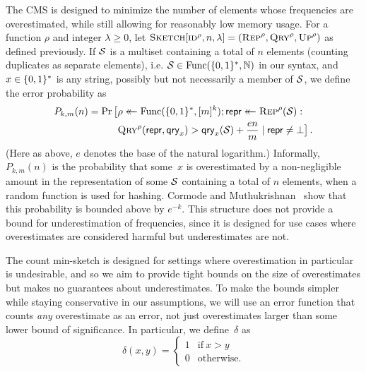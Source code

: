 %
The CMS is designed to minimize the number of elements whose
frequencies are overestimated, while still allowing for reasonably low memory
usage. For a function $\rho$ and integer $\lambda\ge0$, let
$\textnormal{\textsc{Sketch}}[\textnormal{\textsc{id}}^\rho,n,\lambda] = (\textnormal{\textsc{Rep}}^\rho,\textnormal{\textsc{Qry}}^\rho,\textnormal{\textsc{Up}}^\rho)$ as defined
previously. If $\mathcal{S}$ is a multiset containing a total of $n$ elements
(counting duplicates as separate elements), i.e. $\mathcal{S} \in \mathrm{Func}(\{0,1\}^*,\mathbb{N})$ in
our syntax, and $x \in \{0,1\}^*$ is any string, possibly but not necessarily a
member of $\mathcal{S}$, we define the error probability as
\begin{equation}\label{eq:bf-fp}
  \begin{aligned}
    P_{k,m}(n) =
      \Pr\big[&\rho \mathrel{\leftarrow\mkern-14mu\leftarrow} \mathrm{Func}(\{0,1\}^*,[m]^k);
              \mathsf{repr} \mathrel{\leftarrow\mkern-14mu\leftarrow} \textnormal{\textsc{Rep}}^\rho(\mathcal{S}): \\
              &\textnormal{\textsc{Qry}}^\rho(\mathsf{repr}, \mathsf{qry}_x) > \mathsf{qry}_x(\mathcal{S})+\frac{en}{m} \mid \mathsf{repr} \ne \bot
      \big] \,.
  \end{aligned}
\end{equation}
%
(Here as above, $e$ denotes the base of the natural logarithm.)
%
Informally, $P_{k,m}(n)$ is the probability that some~$x$ is overestimated by a
non-negligible amount in the representation of some $\mathcal{S}$ containing a total
of $n$ elements, when a random function is used for hashing. Cormode and
Muthukrishnan~\cite{cormode2005improved} show that this probability is bounded
above by $e^{-k}$. This structure does not provide a bound for underestimation
of frequencies, since it is designed for use cases where overestimates are
considered harmful but underestimates are not.

%
The count min-sketch is designed for settings where overestimation in particular
is undesirable, and so we aim to provide tight bounds on the size of
overestimates but makes no guarantees about underestimates. To make the bounds
simpler while staying conservative in our assumptions, we will use an error
function that counts \emph{any} overestimate as an error, not just overestimates
larger than some lower bound of significance. In particular, we define~$\delta$
as
%
\begin{equation}
  \delta(x, y) =
  \begin{cases}
    1 & \text{if}\ x > y \\
    0 & \text{otherwise.}
  \end{cases}
\end{equation}


